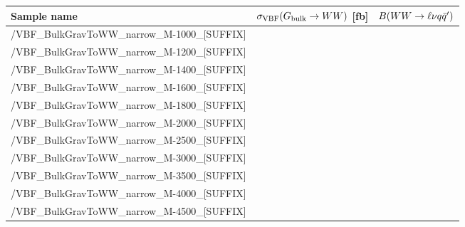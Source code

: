 \scriptsize
\begin{tabular}{lrr}
  \hline
  \textbf{Sample name} & $\sigma_{\mathrm{VBF}}(G_\mathrm{bulk}\to WW)$ [fb] & $B(WW\to\ell\nu q\bar{q}')$ \\
  \hline
  \ttfamily /VBF\_BulkGravToWW\_narrow\_M-1000\_[SUFFIX] &   \\
  \ttfamily /VBF\_BulkGravToWW\_narrow\_M-1200\_[SUFFIX] &   \\
  \ttfamily /VBF\_BulkGravToWW\_narrow\_M-1400\_[SUFFIX] &   \\
  \ttfamily /VBF\_BulkGravToWW\_narrow\_M-1600\_[SUFFIX] &   \\
  \ttfamily /VBF\_BulkGravToWW\_narrow\_M-1800\_[SUFFIX] &   \\
  \ttfamily /VBF\_BulkGravToWW\_narrow\_M-2000\_[SUFFIX] &   \\
  \ttfamily /VBF\_BulkGravToWW\_narrow\_M-2500\_[SUFFIX] &   \\
  \ttfamily /VBF\_BulkGravToWW\_narrow\_M-3000\_[SUFFIX] &   \\
  \ttfamily /VBF\_BulkGravToWW\_narrow\_M-3500\_[SUFFIX] &   \\
  \ttfamily /VBF\_BulkGravToWW\_narrow\_M-4000\_[SUFFIX] &   \\
  \ttfamily /VBF\_BulkGravToWW\_narrow\_M-4500\_[SUFFIX] &   \\
  \hline
\end{tabular}
